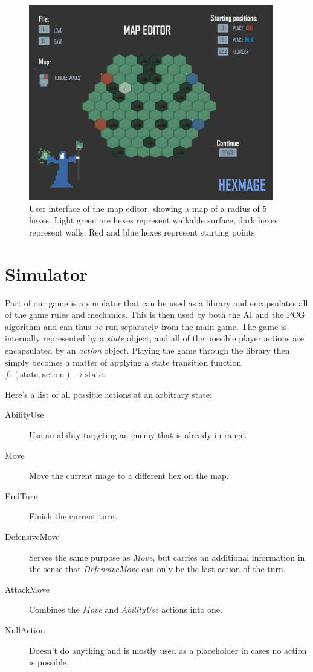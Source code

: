 \begin{figure}[h]
	\centering
	\includegraphics[width=0.95\textwidth]{img/map-editor.png}
	\caption{User interface of the map editor, showing a map of a radius of $5$ hexes. Light green are hexes represent walkable surface, dark hexes represent walls. Red and blue hexes represent starting points.}
	\label{fig:map-editor}
\end{figure}

\section{Simulator}

Part of our game is a simulator that can be used as a library and encapsulates
all of the game rules and mechanics. This is then used by both the AI and the
PCG algorithm and can thus be run separately from the main game. The game is
internally represented by a \emph{state} object, and all of the possible player
actions are encapsulated by an \emph{action} object.  Playing the game through
the library then simply becomes a matter of applying a state transition
function $f: (\text{state}, \text{action}) \rightarrow \text{state}$.

Here's a list of all possible actions at an arbitrary state:

\begin{description}
\item [AbilityUse] Use an ability targeting an enemy that is already in range.
\item [Move] Move the current mage to a different hex on the map.
\item [EndTurn] Finish the current turn.
\item [DefensiveMove] Serves the same purpose as \emph{Move}, but carries an
additional information in the sense that \emph{DefensiveMove} can only be
the last action of the turn.
\item [AttackMove] Combines the \emph{Move} and \emph{AbilityUse} actions into one.
\item [NullAction] Doesn't do anything and is mostly used as a placeholder in cases no action is possible.
\end{description}

